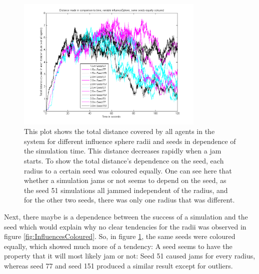 \begin{figure}[h!]
	\centering
		\includegraphics[width=0.80\textwidth]{pictures/ATotalDistanceSeedsColoured.png}
	\caption{This plot shows the total distance covered by all agents in the system for different influence sphere radii and seeds in dependence of the simulation time. This distance decreases rapidly when a jam starts. To show the total distance's dependence on the seed, each radius to a certain seed was coloured equally. One can see here that whether a simulation jams or not seems to depend on the seed, as the seed 51 simulations all jammed independent of the radius, and for the other two seeds, there was only one radius that was different.}
	\label{fig:SeedsColoured}
\end{figure}

\noi Next, there maybe is a dependence between the success of a simulation and the seed which would explain why no clear tendencies for the radii was observed in figure \ref{fig:InfluencesColoured}. So, in figure \ref{fig:SeedsColoured}, the same seeds were coloured equally, which showed much more of a tendency: A seed seems to have the property that it will most likely jam or not: Seed 51 caused jams for every radius, whereas seed 77 and seed 151 produced a similar result except for outliers.

